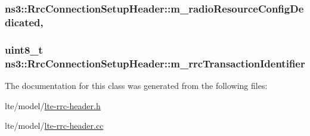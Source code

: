 \subsubsection[{\texorpdfstring{m\+\_\+radio\+Resource\+Config\+Dedicated}{m_radioResourceConfigDedicated}}]{ ns3\+::\+Rrc\+Connection\+Setup\+Header\+::m\+\_\+radio\+Resource\+Config\+Dedicated\hspace{0.3cm}{\ttfamily [mutable]}, {\ttfamily [private]}}\hypertarget{classns3_1_1RrcConnectionSetupHeader_a008ae6a31293cdd4ce73f4f082674fe2}{}\label{classns3_1_1RrcConnectionSetupHeader_a008ae6a31293cdd4ce73f4f082674fe2}
\subsubsection[{\texorpdfstring{m\+\_\+rrc\+Transaction\+Identifier}{m_rrcTransactionIdentifier}}]{\setlength{\rightskip}{0pt plus 5cm}uint8\+\_\+t ns3\+::\+Rrc\+Connection\+Setup\+Header\+::m\+\_\+rrc\+Transaction\+Identifier\hspace{0.3cm}{\ttfamily [private]}}\hypertarget{classns3_1_1RrcConnectionSetupHeader_a623f0298c84418c5c03c19a070118583}{}\label{classns3_1_1RrcConnectionSetupHeader_a623f0298c84418c5c03c19a070118583}


The documentation for this class was generated from the following files\+:\begin{DoxyCompactItemize}
\item 
lte/model/\hyperlink{lte-rrc-header_8h}{lte-\/rrc-\/header.\+h}\item 
lte/model/\hyperlink{lte-rrc-header_8cc}{lte-\/rrc-\/header.\+cc}\end{DoxyCompactItemize}
